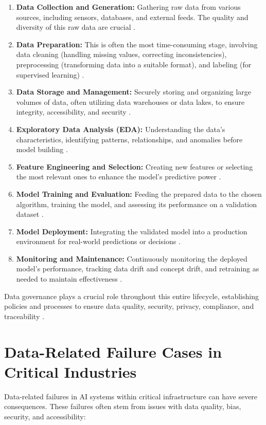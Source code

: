\begin{enumerate}
    \item \textbf{Data Collection and Generation:} Gathering raw data from various sources, including sensors, databases, and external feeds. The quality and diversity of this raw data are crucial \parencite{DataCamp2023}.
    \item \textbf{Data Preparation:} This is often the most time-consuming stage, involving data cleaning (handling missing values, correcting inconsistencies), preprocessing (transforming data into a suitable format), and labeling (for supervised learning) \parencite{DataCamp2023}.
    \item \textbf{Data Storage and Management:} Securely storing and organizing large volumes of data, often utilizing data warehouses or data lakes, to ensure integrity, accessibility, and security \parencite{Komprise2023}.
    \item \textbf{Exploratory Data Analysis (EDA):} Understanding the data's characteristics, identifying patterns, relationships, and anomalies before model building \parencite{GeeksforGeeks2023}.
    \item \textbf{Feature Engineering and Selection:} Creating new features or selecting the most relevant ones to enhance the model's predictive power \parencite{GeeksforGeeks2023}.
    \item \textbf{Model Training and Evaluation:} Feeding the prepared data to the chosen algorithm, training the model, and assessing its performance on a validation dataset \parencite{DataCamp2023}.
    \item \textbf{Model Deployment:} Integrating the validated model into a production environment for real-world predictions or decisions \parencite{DataCamp2023}.
    \item \textbf{Monitoring and Maintenance:} Continuously monitoring the deployed model's performance, tracking data drift and concept drift, and retraining as needed to maintain effectiveness \parencite{Milvus2023}.
\end{enumerate}
Data governance plays a crucial role throughout this entire lifecycle, establishing policies and processes to ensure data quality, security, privacy, compliance, and traceability \parencite{IBM2023DataGovernance}.

\section{Data-Related Failure Cases in Critical Industries}
\label{sec:data_failure_cases}
Data-related failures in AI systems within critical infrastructure can have severe consequences. These failures often stem from issues with data quality, bias, security, and accessibility:

